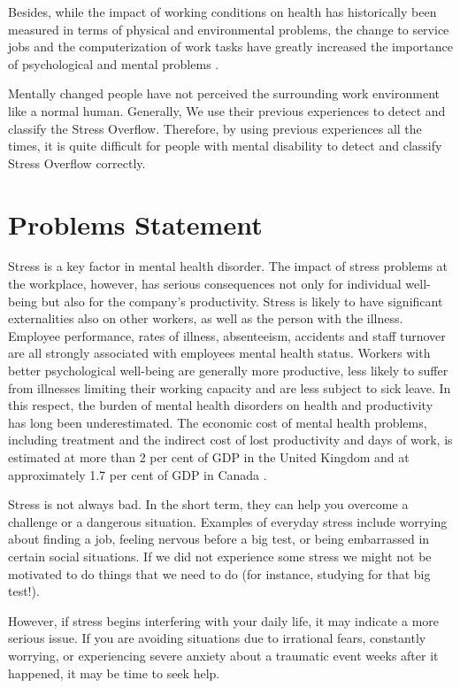 Besides, while the impact of working conditions on health has historically been measured in terms of physical and environmental problems, the change to service jobs and the computerization of work tasks have greatly increased the importance of psychological and mental problems \citep{Cappelli1997ChangeWork}\citep{Robone2008ContractualSurvey}.

Mentally changed people have not perceived the surrounding work environment like a normal human. Generally, We use their previous experiences to detect and classify the Stress Overflow. Therefore, by using previous experiences all the times, it is quite difficult for people with mental disability to detect and classify Stress Overflow correctly.

\section{Problems Statement }

Stress is a key factor in mental health disorder. The impact of stress problems at the workplace, however, has serious consequences not only for individual well-being but also for the company's productivity. Stress is likely to have significant externalities also on other workers, as well as the person with the illness. Employee performance, rates of illness, absenteeism, accidents and staff turnover are all strongly associated with employees mental health status. Workers with better psychological well-being are generally more productive, less likely to suffer from illnesses limiting their working capacity and are less subject to sick leave. 
In this respect, the burden of mental health disorders on health and productivity has long been underestimated. The economic cost of mental health problems, including treatment and the indirect cost of lost productivity and days of work, is estimated at more than 2 per cent of GDP in the United Kingdom \citep{Cooper2005Happiness:Science} and at approximately 1.7 per cent of GDP in Canada \citep{stephens}.

Stress is not always bad. In the short term, they can help you overcome a challenge or a dangerous situation. Examples of everyday stress include worrying about finding a job, feeling nervous before a big test, or being embarrassed in certain social situations. If we did not experience some stress we might not be motivated to do things that we need to do (for instance, studying for that big test!).

However, if stress begins interfering with your daily life, it may indicate a more serious issue. If you are avoiding situations due to irrational fears, constantly worrying, or experiencing severe anxiety about a traumatic event weeks after it happened, it may be time to seek help.

